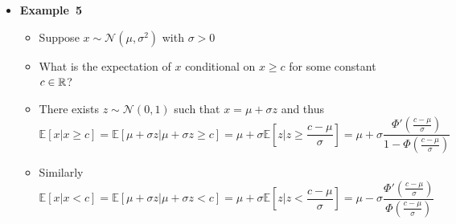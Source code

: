 \documentclass[12pt,a4paper]{article}
\begin{document}
\begin{itemize}
\item \textbf{Example~5}
  \begin{itemize}
  \item Suppose $x\sim \mathcal{N}(\mu,\sigma^{2})$ with $\sigma >0$
  \item What is the expectation of $x$ conditional on $x\geq c$ for some constant $c\in \mathbb{R}$?
  \item There exists $z\sim \mathcal{N}(0,1)$ such that $x=\mu+\sigma z$ and thus
    \begin{equation}\nonumber%
      \mathbb{E}\left[ x | x \geq c \right]
      = \mathbb{E}\left[ \mu + \sigma z | \mu + \sigma z \geq c \right]
      = \mu + \sigma\mathbb{E}\left[z \bigg| z \geq \frac{c - \mu}{\sigma} \right]
      = \mu + \sigma \frac{\Phi'\left(\frac{c - \mu}{\sigma}\right) }{1-\Phi\left(\frac{c - \mu}{\sigma}\right)}
    \end{equation}
  \item Similarly
    \begin{equation}\nonumber%
      \mathbb{E}\left[ x | x < c \right]
      = \mathbb{E}\left[ \mu + \sigma z | \mu + \sigma z < c \right]
      = \mu + \sigma\mathbb{E}\left[z \bigg| z < \frac{c - \mu}{\sigma} \right]
      = \mu - \sigma \frac{\Phi'\left(\frac{c - \mu}{\sigma}\right) }{\Phi\left(\frac{c - \mu}{\sigma}\right)}
    \end{equation}
  \end{itemize}


\end{itemize}
\end{document}

